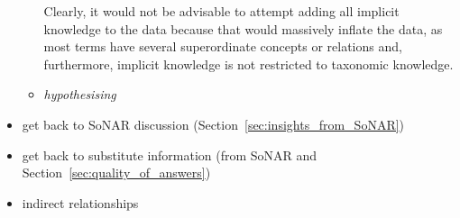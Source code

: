 \begin{itemize}
\begin{itemize}
        Clearly, it would not be advisable to attempt adding all implicit knowledge to the data
        because that would massively inflate the data,
        as most terms have several superordinate concepts or relations and,
        furthermore, implicit knowledge is not restricted to taxonomic knowledge.
      \item
        \emph{hypothesising}
    \end{itemize}
  \item
    get back to SoNAR discussion (Section~\ref{sec:insights_from_SoNAR})
  \item
    get back to substitute information (from SoNAR and Section~\ref{sec:quality_of_answers})
  \item
    indirect relationships
\end{itemize}
